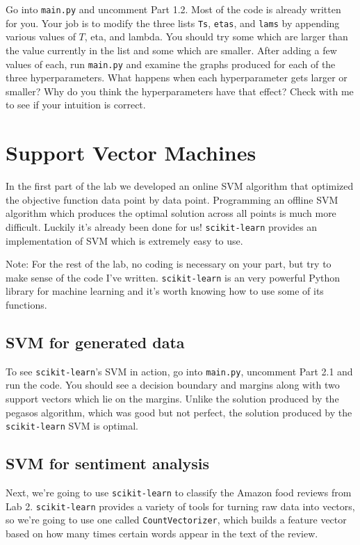 \documentclass{article}
\begin{document}
Go into \texttt{main.py} and uncomment Part 1.2. Most of the code is already written for you. Your job is to modify the three lists \texttt{Ts}, \texttt{etas}, and \texttt{lams} by appending various values of $T$, eta, and lambda. You should try some which are larger than the value currently in the list and some which are smaller. After adding a few values of each, run \texttt{main.py} and examine the graphs produced for each of the three hyperparameters. What happens when each hyperparameter gets larger or smaller? Why do you think the hyperparameters have that effect? Check with me to see if your intuition is correct.

\section{Support Vector Machines}

In the first part of the lab we developed an online SVM algorithm that optimized the objective function data point by data point. Programming an offline SVM algorithm which produces the optimal solution across all points is much more difficult. Luckily it's already been done for us! \texttt{scikit-learn} provides an implementation of SVM which is extremely easy to use.

Note: For the rest of the lab, no coding is necessary on your part, but try to make sense of the code I've written. \texttt{scikit-learn} is an very powerful Python library for machine learning and it's worth knowing how to use some of its functions.

\subsection{SVM for generated data}

To see \texttt{scikit-learn}'s SVM in action, go into \texttt{main.py}, uncomment Part 2.1 and run the code. You should see a decision boundary and margins along with two support vectors which lie on the margins. Unlike the solution produced by the pegasos algorithm, which was good but not perfect, the solution produced by the \texttt{scikit-learn} SVM is optimal.

\subsection{SVM for sentiment analysis}

Next, we're going to use \texttt{scikit-learn} to classify the Amazon food reviews from Lab 2. \texttt{scikit-learn} provides a variety of tools for turning raw data into vectors, so we're going to use one called \texttt{CountVectorizer}, which builds a feature vector based on how many times certain words appear in the text of the review.
\end{document}

